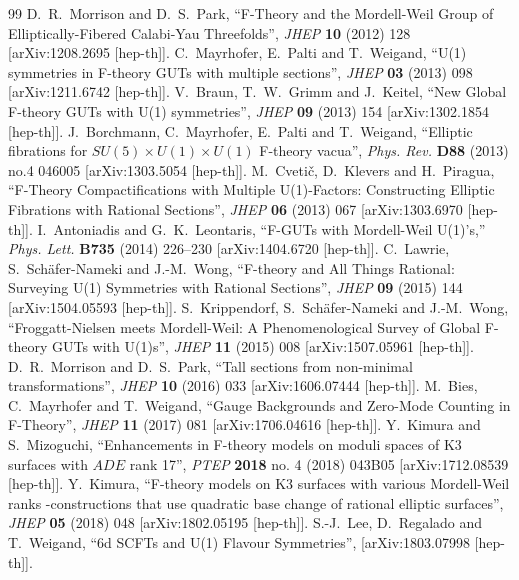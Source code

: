 \documentclass[12pt]{article}
\begin{document}
\begin{thebibliography}{99}
D.~R.~Morrison and D.~S.~Park, ``F-Theory and the Mordell-Weil Group of Elliptically-Fibered Calabi-Yau Threefolds'', {\it JHEP} {\bf 10} (2012) 128 [arXiv:1208.2695 [hep-th]].
C.~Mayrhofer, E.~Palti and T.~Weigand, ``U(1) symmetries in F-theory GUTs with multiple sections'', {\it JHEP} {\bf 03} (2013) 098 [arXiv:1211.6742 [hep-th]].
V.~Braun, T.~W.~Grimm and J.~Keitel, ``New Global F-theory GUTs with U(1) symmetries'', {\it JHEP} {\bf 09} (2013) 154 [arXiv:1302.1854 [hep-th]].
J.~Borchmann, C.~Mayrhofer, E.~Palti and T.~Weigand, ``Elliptic fibrations for $SU(5)\times U(1)\times U(1)$ F-theory vacua'', {\it Phys. Rev.} {\bf D88} (2013) no.4 046005 [arXiv:1303.5054 [hep-th]].
M.~Cveti\v c, D.~Klevers and H.~Piragua, ``F-Theory Compactifications with Multiple U(1)-Factors: Constructing Elliptic Fibrations with Rational Sections'', {\it JHEP} {\bf 06} (2013) 067 [arXiv:1303.6970 [hep-th]].
I.~Antoniadis and G.~K.~Leontaris, ``F-GUTs with Mordell-Weil U(1)'s,'' {\it Phys. Lett.} {\bf B735} (2014) 226--230 [arXiv:1404.6720 [hep-th]].
C.~Lawrie, S.~Sch\"afer-Nameki and J.-M.~Wong, ``F-theory and All Things Rational: Surveying U(1) Symmetries with Rational Sections'', {\it JHEP} {\bf 09} (2015) 144 [arXiv:1504.05593 [hep-th]].
S.~Krippendorf, S.~Sch\"afer-Nameki and J.-M.~Wong, ``Froggatt-Nielsen meets Mordell-Weil: A Phenomenological Survey of Global F-theory GUTs with U(1)s'', {\it JHEP} {\bf 11} (2015) 008 [arXiv:1507.05961 [hep-th]].
D.~R.~Morrison and D.~S.~Park, ``Tall sections from non-minimal transformations'', {\it JHEP} {\bf 10} (2016) 033 [arXiv:1606.07444 [hep-th]]. 
M.~Bies, C.~Mayrhofer and T.~Weigand, ``Gauge Backgrounds and Zero-Mode Counting in F-Theory'', {\it JHEP} {\bf 11} (2017) 081 [arXiv:1706.04616 [hep-th]].
Y.~Kimura and S.~Mizoguchi, ``Enhancements in F-theory models on moduli spaces of K3 surfaces with $ADE$ rank 17'', {\it PTEP} {\bf 2018} no. 4 (2018) 043B05 [arXiv:1712.08539 [hep-th]].
Y.~Kimura, ``F-theory models on K3 surfaces with various Mordell-Weil ranks -constructions that use quadratic base change of rational elliptic surfaces'', {\it JHEP} {\bf 05} (2018) 048 [arXiv:1802.05195 [hep-th]].
S.-J.~Lee, D.~Regalado and T.~Weigand, ``6d SCFTs and U(1) Flavour Symmetries'', [arXiv:1803.07998 [hep-th]].


\end{thebibliography}
\end{document}
